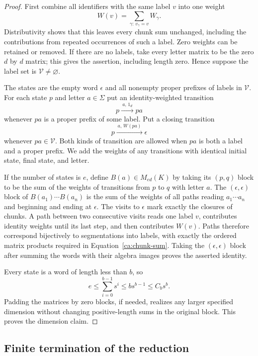 \begin{proof}
First combine all identifiers with the same label $v$ into one weight
\[
  W(v)=\sum_{\gamma:\,v_\gamma=v}W_\gamma.
\]
Distributivity shows that this leaves every chunk sum unchanged, including
the contributions from repeated occurrences of such a label.  Zero
weights can be retained or removed.  If there are no labels, take every
letter matrix to be the zero $d$ by $d$ matrix; this gives the assertion,
including length zero.  Hence suppose the label set is
$\mathcal V\ne\varnothing$.

The states are the empty word $\epsilon$ and all nonempty proper prefixes
of labels in $\mathcal V$.  For each state $p$ and letter $a\in\Sigma$
put an identity-weighted transition
\[
  p\xrightarrow{\ a,\,1_d\ }pa
\]
whenever $pa$ is a proper prefix of some label.  Put a closing transition
\[
  p\xrightarrow{\ a,\,W(pa)\ }\epsilon
\]
whenever $pa\in\mathcal V$.  Both kinds of transition are allowed when
$pa$ is both a label and a proper prefix.  We add the weights of any
transitions with identical initial state, final state, and letter.

If the number of states is $e$, define $B(a)\in M_{ed}(K)$ by taking its
$(p,q)$ block to be the sum of the weights of transitions from $p$ to $q$
with letter $a$.  The $(\epsilon,\epsilon)$ block of
$B(a_1)\cdots B(a_n)$ is the sum of the weights of all paths reading
$a_1\cdots a_n$ and beginning and ending at $\epsilon$.  The visits to
$\epsilon$ mark exactly the closures of chunks.  A path between two
consecutive visits reads one label $v$, contributes identity weights
until its last step, and then contributes $W(v)$.  Paths therefore
correspond bijectively to segmentations into labels, with exactly the
ordered matrix products required in Equation~\eqref{ca:chunk-sum}.
Taking the $(\epsilon,\epsilon)$ block after summing the words with their
algebra images proves the asserted identity.

Every state is a word of length less than $b$, so
\[
  e\leq\sum_{i=0}^{b-1}s^i\leq b s^{b-1}\leq C_b s^b.
\]
Padding the matrices by zero blocks, if needed, realizes any larger
specified dimension without changing positive-length sums in the original
block.  This proves the dimension claim.
\end{proof}

\subsection{Finite termination of the reduction}

